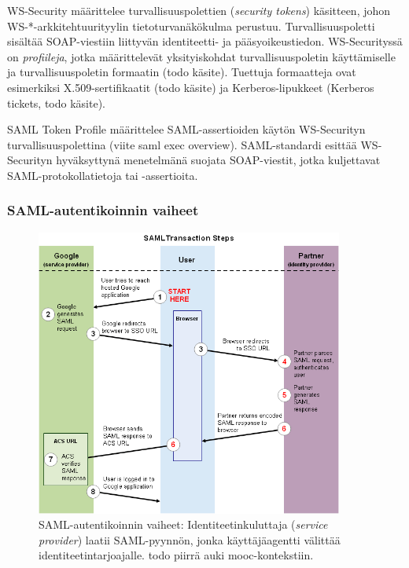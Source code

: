 \documentclass[finnish,gradu]{tktltiki}
\begin{document}
  WS-Security määrittelee turvallisuuspolettien (\emph{security tokens}) käsitteen, johon WS-*-arkkitehtuurityylin tietoturvanäkökulma perustuu.
  Turvallisuuspoletti sisältää SOAP-viestiin liittyvän identiteetti- ja pääsyoikeustiedon.
  WS-Securityssä on \emph{profiileja}, jotka määrittelevät yksityiskohdat turvallisuuspoletin käyttämiselle ja turvallisuuspoletin formaatin (todo käsite).
  Tuettuja formaatteja ovat esimerkiksi X.509-sertifikaatit (todo käsite) ja Kerberos-lipukkeet (Kerberos tickets, todo käsite).

  SAML Token Profile määrittelee SAML-assertioiden käytön WS-Securityn turvallisuuspolettina (viite saml exec overview).
  SAML-standardi esittää WS-Securityn hyväksyttynä menetelmänä suojata SOAP-viestit, jotka kuljettavat SAML-protokollatietoja tai -assertioita.



  \subsubsection{SAML-autentikoinnin vaiheet} %
  \label{ssub:saml_autentikoinnin_vaiheet}

    \begin{figure}
      \centering
      \includegraphics[width=0.9\textwidth]{images/google_saml_workflow_vertical.png}
      \caption{SAML-autentikoinnin vaiheet: Identiteetinkuluttaja (\emph{service provider}) laatii SAML-pyynnön, jonka käyttäjäagentti välittää identiteetintarjoajalle. todo piirrä auki mooc-kontekstiin.}
      \label{fig:saml_auth_vaiheet}
    \end{figure}
\end{document}
